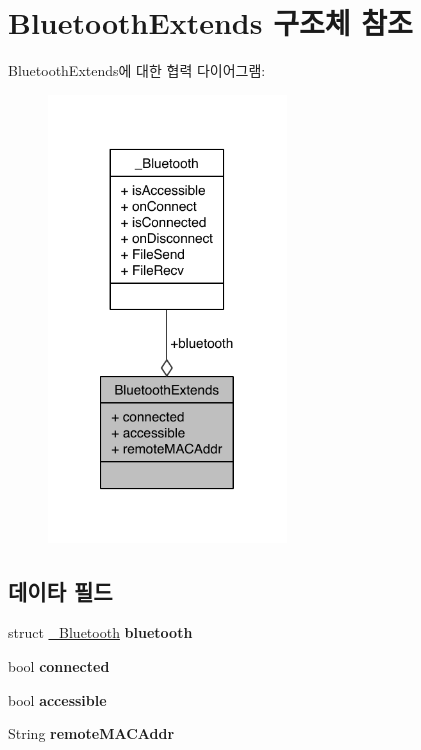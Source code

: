 \hypertarget{struct_bluetooth_extends}{\section{Bluetooth\-Extends 구조체 참조}
\label{struct_bluetooth_extends}
}


Bluetooth\-Extends에 대한 협력 다이어그램\-:\nopagebreak
\begin{figure}[H]
\begin{center}
\leavevmode
\includegraphics[width=179pt]{dc/d71/struct_bluetooth_extends__coll__graph}
\end{center}
\end{figure}
\subsection*{데이타 필드}
\begin{DoxyCompactItemize}
\item 
\hypertarget{struct_bluetooth_extends_afe4e56b7ac932d03957e2c38f209f55c}{struct \hyperlink{struct___bluetooth}{\-\_\-\-Bluetooth} {\bfseries bluetooth}}\label{struct_bluetooth_extends_afe4e56b7ac932d03957e2c38f209f55c}

\item 
\hypertarget{struct_bluetooth_extends_ab36823025f12a809217f7771125658c2}{bool {\bfseries connected}}\label{struct_bluetooth_extends_ab36823025f12a809217f7771125658c2}

\item 
\hypertarget{struct_bluetooth_extends_a348a5a495aba2753e3e5e5d013f1c612}{bool {\bfseries accessible}}\label{struct_bluetooth_extends_a348a5a495aba2753e3e5e5d013f1c612}

\item 
\hypertarget{struct_bluetooth_extends_a473f43fc5e8e19c1221c16e6fac3cb63}{String {\bfseries remote\-M\-A\-C\-Addr}}\label{struct_bluetooth_extends_a473f43fc5e8e19c1221c16e6fac3cb63}

\end{DoxyCompactItemize}


